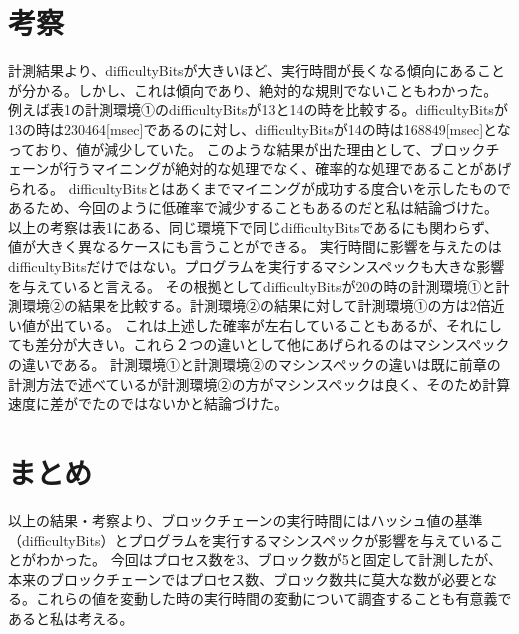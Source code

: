 \documentclass[uplatex, twocolumn, dvipdfmx, 10pt]{jsarticle}
\begin{document}
\section{考察}
計測結果より、difficultyBitsが大きいほど、実行時間が長くなる傾向にあることが分かる。しかし、これは傾向であり、絶対的な規則でないこともわかった。
例えば表1の計測環境①のdifficultyBitsが13と14の時を比較する。difficultyBitsが13の時は230464[msec]であるのに対し、difficultyBitsが14の時は168849[msec]となっており、値が減少していた。
このような結果が出た理由として、ブロックチェーンが行うマイニングが絶対的な処理でなく、確率的な処理であることがあげられる。
difficultyBitsとはあくまでマイニングが成功する度合いを示したものであるため、今回のように低確率で減少することもあるのだと私は結論づけた。
以上の考察は表1にある、同じ環境下で同じdifficultyBitsであるにも関わらず、値が大きく異なるケースにも言うことができる。
実行時間に影響を与えたのはdifficultyBitsだけではない。プログラムを実行するマシンスペックも大きな影響を与えていると言える。
その根拠としてdifficultyBitsが20の時の計測環境①と計測環境②の結果を比較する。計測環境②の結果に対して計測環境①の方は2倍近い値が出ている。
これは上述した確率が左右していることもあるが、それにしても差分が大きい。これら２つの違いとして他にあげられるのはマシンスペックの違いである。
計測環境①と計測環境②のマシンスペックの違いは既に前章の計測方法で述べているが計測環境②の方がマシンスペックは良く、そのため計算速度に差がでたのではないかと結論づけた。

\section{まとめ}
以上の結果・考察より、ブロックチェーンの実行時間にはハッシュ値の基準（difficultyBits）とプログラムを実行するマシンスペックが影響を与えていることがわかった。
今回はプロセス数を3、ブロック数が5と固定して計測したが、本来のブロックチェーンではプロセス数、ブロック数共に莫大な数が必要となる。これらの値を変動した時の実行時間の変動について調査することも有意義であると私は考える。
\end{document}
